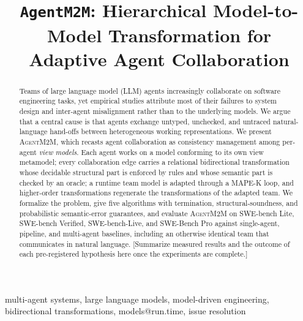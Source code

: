 \documentclass[10pt, anonymous, conference]{IEEEtran}
\theoremstyle{definition}
\theoremstyle{plain}
\theoremstyle{remark}
\newcommand{\tool}{\textsc{AgentM2M}}
\newcommand{\fixme}[1]{{\color{red}[#1]}}
\begin{document}
\title{\texttt{AgentM2M}: Hierarchical Model-to-Model Transformation for Adaptive Agent Collaboration}


\maketitle

\begin{abstract}
Teams of large language model (LLM) agents increasingly collaborate on
software engineering tasks, yet empirical studies attribute most of their
failures to system design and inter-agent misalignment rather than to the
underlying models. We argue that a central cause is that agents exchange
untyped, unchecked, and untraced natural-language hand-offs between
heterogeneous working representations. We present \tool{}, which recasts agent
collaboration as consistency management among per-agent \emph{view models}.
Each agent works on a model conforming to its own view metamodel; every
collaboration edge carries a relational bidirectional transformation whose
decidable structural part is enforced by rules and whose semantic part is
checked by an oracle; a runtime team model is adapted through a MAPE-K loop,
and higher-order transformations regenerate the transformations of the
adapted team. We formalize the problem, give five algorithms with termination,
structural-soundness, and probabilistic semantic-error guarantees, and evaluate
\tool{} on SWE-bench Lite, SWE-bench Verified, SWE-bench-Live, and SWE-Bench
Pro against single-agent, pipeline, and multi-agent baselines, including an
otherwise identical team that communicates in natural language.
\fixme{Summarize measured results and the outcome of each pre-registered
hypothesis here once the experiments are complete.}
\end{abstract}

\begin{IEEEkeywords}
multi-agent systems, large language models, model-driven engineering,
bidirectional transformations, models@run.time, issue resolution
\end{IEEEkeywords}



\end{document}
